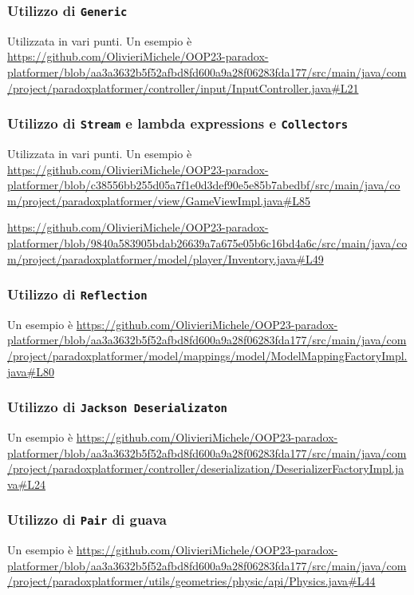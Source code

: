 \documentclass[a4paper,12pt]{report}
\begin{document}
\subsubsection{Utilizzo di \texttt{Generic}}
Utilizzata in vari punti.
Un esempio è
\url{https://github.com/OlivieriMichele/OOP23-paradox-platformer/blob/aa3a3632b5f52afbd8fd600a9a28f06283fda177/src/main/java/com/project/paradoxplatformer/controller/input/InputController.java#L21}

\subsubsection{Utilizzo di \texttt{Stream} e lambda expressions e \texttt{Collectors}}
Utilizzata in vari punti.
Un esempio è
\url{https://github.com/OlivieriMichele/OOP23-paradox-platformer/blob/c38556bb255d05a7f1e0d3def90e5e85b7abedbf/src/main/java/com/project/paradoxplatformer/view/GameViewImpl.java#L85}

\url{https://github.com/OlivieriMichele/OOP23-paradox-platformer/blob/9840a583905bdab26639a7a675e05b6c16bd4a6c/src/main/java/com/project/paradoxplatformer/model/player/Inventory.java#L49}

\subsubsection{Utilizzo di \texttt{Reflection}}
Un esempio è
\url{https://github.com/OlivieriMichele/OOP23-paradox-platformer/blob/aa3a3632b5f52afbd8fd600a9a28f06283fda177/src/main/java/com/project/paradoxplatformer/model/mappings/model/ModelMappingFactoryImpl.java#L80}

\subsubsection{Utilizzo di \texttt{Jackson Deserializaton}}
Un esempio è
\url{https://github.com/OlivieriMichele/OOP23-paradox-platformer/blob/aa3a3632b5f52afbd8fd600a9a28f06283fda177/src/main/java/com/project/paradoxplatformer/controller/deserialization/DeserializerFactoryImpl.java#L24}

\subsubsection{Utilizzo di \texttt{Pair} di guava}
Un esempio è
\url{https://github.com/OlivieriMichele/OOP23-paradox-platformer/blob/aa3a3632b5f52afbd8fd600a9a28f06283fda177/src/main/java/com/project/paradoxplatformer/utils/geometries/physic/api/Physics.java#L44}
\end{document}
